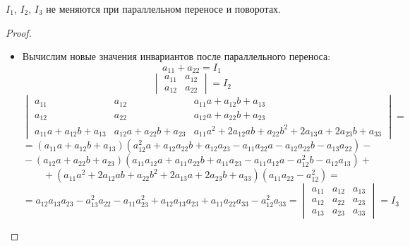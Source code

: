 \begin{theorem}
$I_1$, $I_2$, $I_3$ не меняются при параллельном переносе и поворотах.
\end{theorem}
\begin{proof}
\begin{itemize}
	\item Вычислим новые значения инвариантов после параллельного переноса:
	\begin{equation*}
	a_{11} + a_{22} = I_1
	\end{equation*}
	\begin{equation*}
	\begin{vmatrix}
	a_{11} & a_{12} \\
	a_{12} & a_{22}
	\end{vmatrix} = I_2
	\end{equation*}
	\begin{equation*}
	\begin{vmatrix}
	a_{11} & a_{12} & a_{11} a + a_{12} b + a_{13} \\
	a_{12} & a_{22} & a_{12} a + a_{22} b + a_{23} \\
	a_{11} a + a_{12} b + a_{13} & a_{12} a + a_{22} b + a_{23} & a_{11} a^2 + 2 a_{12} ab + a_{22} b^2 + 2 a_{13} a + 2 a_{23} b + a_{33}
	\end{vmatrix} =
	\end{equation*}
	\begin{equation*}
	= (a_{11} a + a_{12} b + a_{13}) (a_{12}^2 a + a_{12} a_{22} b + a_{12} a_{23} - a_{11} a_{22} a - a_{12} a_{22} b - a_{13} a_{22}) - {}
	\end{equation*}
	\begin{equation*}
	{} - (a_{12} a + a_{22} b + a_{23}) (a_{11} a_{12} a + a_{11} a_{22} b + a_{11} a_{23} - a_{11} a_{12} a - a_{12}^2 b - a_{12} a_{13}) + {}
	\end{equation*}
	\begin{equation*}
	{} + (a_{11} a^2 + 2 a_{12} ab + a_{22} b^2 + 2 a_{13} a + 2 a_{23} b + a_{33}) (a_{11} a_{22} - a_{12}^2) =
	\end{equation*}
	\begin{equation*}
	= a_{12} a_{13} a_{23} - a_{13}^2 a_{22} - a_{11} a_{23}^2 + a_{12} a_{13} a_{23} + a_{11} a_{22} a_{33} - a_{12}^2 a_{33} =
	\begin{vmatrix}
	a_{11} & a_{12} & a_{13} \\
	a_{12} & a_{22} & a_{23} \\
	a_{13} & a_{23} & a_{33}
	\end{vmatrix} = I_3
	\end{equation*}
	

\end{itemize}
\end{proof}
